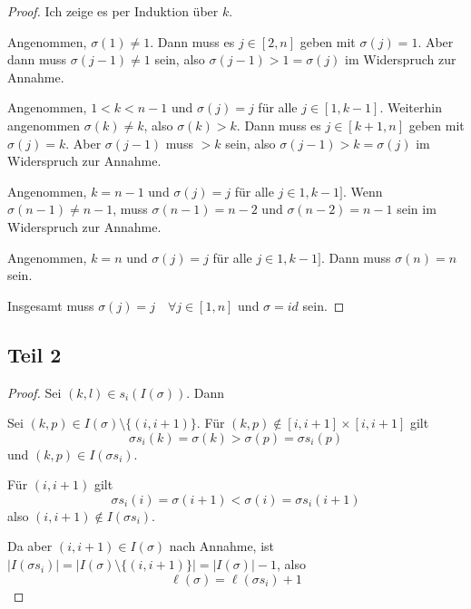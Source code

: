 \documentclass[10pt,a4paper]{article}
\begin{document}
\begin{proof}
Ich zeige es per Induktion über $k$.

Angenommen, $\sigma(1) \ne 1$.
Dann muss es $j \in [2, n]$ geben mit $\sigma(j) = 1$.
Aber dann muss $\sigma(j - 1) \ne 1$ sein, also $\sigma(j - 1) > 1 = \sigma(j)$ im Widerspruch zur Annahme.

Angenommen, $1 < k < n - 1$ und $\sigma(j) = j$ für alle $j \in [1, k - 1]$.
Weiterhin angenommen $\sigma(k) \ne k$, also $\sigma(k) > k$.
Dann muss es $j \in [k + 1, n]$ geben mit $\sigma(j) = k$.
Aber $\sigma(j - 1)$ muss $> k$ sein, also $\sigma(j - 1) > k = \sigma(j)$ im Widerspruch zur Annahme.

Angenommen, $k = n - 1$ und $\sigma(j) = j$ für alle $j \in 1, k - 1]$.
Wenn $\sigma(n - 1) \ne n - 1$, muss $\sigma(n - 1) = n - 2$ und $\sigma(n - 2) = n - 1$ sein im Widerspruch zur Annahme.

Angenommen, $k = n$ und $\sigma(j) = j$ für alle $j \in 1, k - 1]$.
Dann muss $\sigma(n) = n$ sein.

Insgesamt muss $\sigma(j) = j \quad \forall j \in [1, n]$ und $\sigma = id$ sein.
\end{proof}

\subsection*{Teil 2}

\begin{proof}
Sei $(k, l) \in s_{i}(I(\sigma))$.
Dann 

Sei $(k, p) \in I(\sigma) \setminus \{(i, i + 1)\}$.
Für $(k, p) \notin [i, i + 1] \times [i, i + 1]$ gilt
\begin{equation}
\sigma s_{i}(k) = \sigma(k) > \sigma(p) = \sigma s_{i}(p)
\end{equation}
und $(k, p) \in I(\sigma s_{i})$.

Für $(i, i + 1)$ gilt
\begin{equation}
\sigma s_{i}(i) = \sigma(i + 1) < \sigma(i) = \sigma s_{i}(i + 1)
\end{equation}
also $(i, i + 1) \notin I(\sigma s_{i})$.

Da aber $(i, i + 1) \in I(\sigma)$ nach Annahme, ist $|I(\sigma s_{i})| = |I(\sigma) \setminus \{(i, i + 1)\}| = |I(\sigma)| - 1$, also
\begin{equation}
\ell(\sigma) = \ell(\sigma s_{i}) + 1
\end{equation}
\end{proof}
\end{document}
